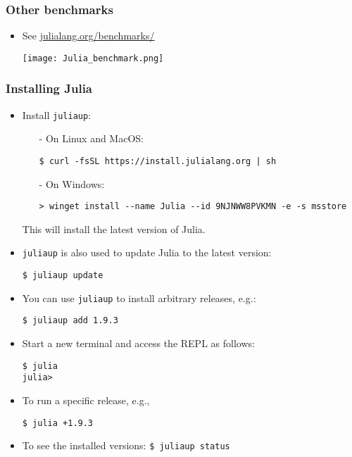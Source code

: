 \documentclass[t,usepdftitle=false]{beamer}
\begin{document}
\begin{frame}
	\frametitle{Other benchmarks}
	\begin{itemize}
		\item See \url{julialang.org/benchmarks/}
		\begin{center}
		\vspace{.2cm}
		\texttt{[image: Julia\_benchmark.png]}  
		\end{center}
	\end{itemize}
\end{frame}

\begin{frame}[fragile]
	\frametitle{Installing Julia}
	\begin{itemize}
		\item Install \texttt{juliaup}:
		\begin{itemize}\normalsize
		\item[-] On Linux and MacOS:\\
		\begin{verbatim}
$ curl -fsSL https://install.julialang.org | sh
		\end{verbatim}
		\item[-] On Windows:\\
		\small
		\begin{verbatim}
> winget install --name Julia --id 9NJNWW8PVKMN -e -s msstore
		\end{verbatim}
		\normalsize
		\end{itemize}
		This will install the latest version of Julia.
		\item \texttt{juliaup} is also used to update Julia to the latest version:
		\begin{verbatim}
$ juliaup update
		\end{verbatim}
		\item You can use \texttt{juliaup} to install arbitrary releases, e.g.:
\begin{verbatim}
$ juliaup add 1.9.3
\end{verbatim}
		\item Start a new terminal and access the REPL as follows:
\begin{verbatim}
$ julia
julia>
\end{verbatim}
		\item To run a specific release, e.g.,
\begin{verbatim}
$ julia +1.9.3
\end{verbatim}
		\item To see the installed versions:	
		\texttt{\$ juliaup status}
	\end{itemize}
\end{frame}  
  
\end{document}
